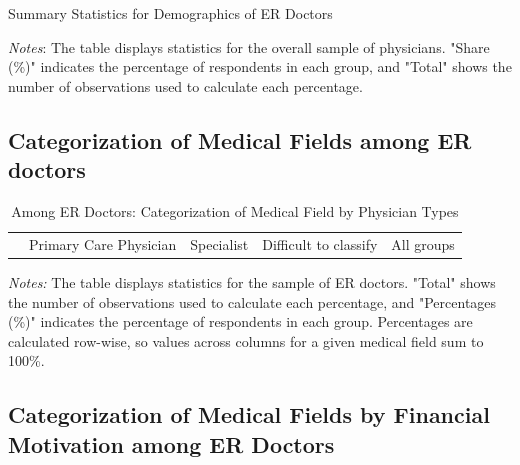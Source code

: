 \documentclass[11pt]{article}
\theoremstyle{definition}
\begin{document}
\begin{table}[H]
    \centering
    \caption{Summary Statistics for Demographics of ER Doctors}
              \begin{adjustbox}{width=0.55\linewidth}  

\end{adjustbox}
     \parbox{.9\linewidth}{
        	\vspace{.2cm}
        		\scriptsize{\scriptsize{{\emph{Notes}: The table displays statistics for the overall sample of physicians. "Share (\%)" indicates the percentage of respondents in each group, and "Total" shows the number of observations used to calculate each percentage.}}}}
    \label{tab:demo_table}
\end{table}

\subsection{Categorization of Medical Fields among ER doctors}

\begin{table}[H]
    \centering
    \caption{Among ER Doctors: Categorization of Medical Field by Physician Types}
    \begin{adjustbox}{width=0.75\linewidth} 
    \begin{tabular}{lccccccc}\toprule 
    & \multicolumn{2}{c}{Primary Care Physician} & \multicolumn{2}{c}{Specialist} & \multicolumn{2}{c}{Difficult to classify} & {All groups} \\
    \cmidrule(lr){2-3} \cmidrule(lr){4-5} \cmidrule(lr){6-7}  
    
    \end{tabular}
    \end{adjustbox}
    \label{tab:med_field_cat_phystype}
          {\parbox{1\linewidth}{           %
    		\scriptsize{{{ \textit{Notes:} The table displays statistics for the sample of ER doctors. "Total" shows the number of observations used to calculate each percentage, and "Percentages (\%)" indicates the percentage of respondents in each group. Percentages are calculated row-wise, so values across columns for a given medical field sum to 100\%.}}}}}
\end{table}

\subsection{Categorization of Medical Fields by Financial Motivation among ER Doctors}
\end{document}
